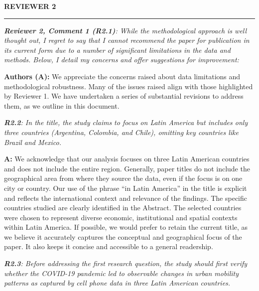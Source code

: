 \documentclass[12pt,a4paper,oneside, reqno]{amsart}
\begin{document}
\vspace{10pt}

\setlength{\leftskip}{0cm} \textbf{REVIEWER 2}
\vspace{-16pt}
\begin{center}
    \rule{\textwidth}{.1pt}
\end{center}

\vspace{5pt}

\setlength{\leftskip}{0cm} \textit{\textbf{Reviewer 2, Comment 1 (R2.1)}: While the methodological approach is well thought out, I regret to say that I cannot recommend the paper for publication in its current form due to a number of significant limitations in the data and methods. Below, I detail my concerns and offer suggestions for improvement:
}

\setlength{\leftskip}{1cm}\textbf{Authors (A):} We appreciate the concerns raised about data limitations and methodological robustness. Many of the issues raised align with those highlighted by Reviewer 1. We have undertaken a series of substantial revisions to address them, as we outline in this document.

\setlength{\leftskip}{0cm} \textit{\textbf{R2.2}: In the title, the study claims to focus on Latin America but includes only three countries (Argentina, Colombia, and Chile), omitting key countries like Brazil and Mexico.}

\setlength{\leftskip}{1cm}\textbf{A:}  We acknowledge that our analysis focuses on three Latin American countries and does not include the entire region. Generally, paper titles do not include the geographical area from where they source the data, even if the focus is on one city or country. Our use of the phrase ``in Latin America'' in the title is explicit and reflects the international context and relevance of the findings. The specific countries studied are clearly identified in the Abstract. The selected countries were chosen to represent diverse economic, institutional and spatial contexts within Latin America. If possible, we would prefer to retain the current title, as we believe it accurately captures the conceptual and geographical focus of the paper. It also keeps it concise and accessible to a general readership.

\setlength{\leftskip}{0cm} \textit{\textbf{R2.3}: Before addressing the first research question, the study should first verify whether the COVID-19 pandemic led to observable changes in urban mobility patterns as captured by cell phone data in three Latin American countries.}
\end{document}
